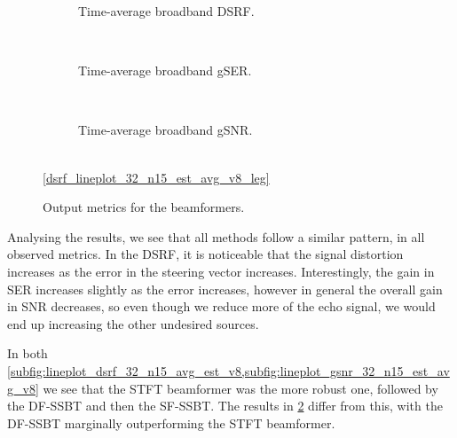 \begin{figure}[!t]
	\begin{subfigure}{\textwidth}
		\centering
		
		\caption{Time-average broadband DSRF.}
		\label{subfig:lineplot_dsrf_32_n15_avg_est_v8}
	\end{subfigure}\\[1em]
	\begin{subfigure}{\textwidth}
		\centering
		
		\caption{Time-average broadband gSER.}
		\label{subfig:lineplot_gser_32_n15_avg_est_v8}
	\end{subfigure}\\[1em]
	\begin{subfigure}{\textwidth}
		\centering
		
		\caption{Time-average broadband gSNR.}
		\label{subfig:lineplot_gsnr_32_n15_est_avg_v8}
	\end{subfigure}\\[1em]
	\centering\ref*{dsrf_lineplot_32_n15_est_avg_v8_leg}
	\caption{Output metrics for the beamformers.}
	\label{fig:lineplots_32_n15_est_avg_v8}
\end{figure}

Analysing the results, we see that all methods follow a similar pattern, in all observed metrics. In the DSRF, it is noticeable that the signal distortion increases as the error in the steering vector increases. Interestingly, the gain in SER increases slightly as the error increases, however in general the overall gain in SNR decreases, so even though we reduce more of the echo signal, we would end up increasing the other undesired sources.

In both \cref{subfig:lineplot_dsrf_32_n15_avg_est_v8,subfig:lineplot_gsnr_32_n15_est_avg_v8} we see that the STFT beamformer was the more robust one, followed by the DF-SSBT and then the SF-SSBT. The results in \cref{subfig:lineplot_gser_32_n15_avg_est_v8} differ from this, with the DF-SSBT marginally outperforming the STFT beamformer.